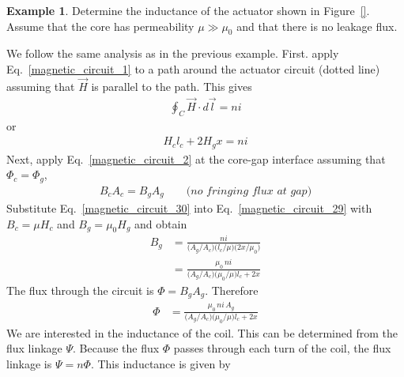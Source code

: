 \documentclass[11pt,a4paper,oneside]{book}
\numberwithin{equation}{section}
\theoremstyle{it}
\theoremstyle{definition}
\newtheorem{example}{Example}[section]
\begin{document}
\begin{example}
	Determine the inductance of the actuator shown in Figure~\ref{}. Assume that the core has permeability $\mu\gg\mu_0$ and that there is no leakage flux.
	
	We follow the same analysis as in the previous example.  First. apply Eq.~\eqref{magnetic_circuit_1} to a path around the actuator circuit (dotted line) assuming that $\vec{H}$ is parallel to the path. This gives
	\begin{equation*}\label{}
	{\begin{aligned}
			\oint_{C}\vec{H}\cdot d\vec{l}=ni
	\end{aligned}}
	\end{equation*}
or
	\begin{equation}\label{magnetic_circuit_29}
		{\begin{aligned}
			H_cl_c+2H_gx=ni
		\end{aligned}}
	\end{equation}
Next, apply Eq.~\eqref{magnetic_circuit_2} at the core-gap interface assuming that $\Phi_c=\Phi_g$,
	\begin{equation}\label{magnetic_circuit_30}
	{\begin{aligned}
			B_cA_c=B_gA_g\qquad\textit{(no fringing flux at gap)}
	\end{aligned}}
	\end{equation}
Substitute Eq.~\eqref{magnetic_circuit_30} into Eq.~\eqref{magnetic_circuit_29} with $B_c=\mu H_c$ and $B_g=\mu_0 H_g$ and obtain
\begin{equation*}\label{}
{\begin{aligned}
		B_g &=\frac{ni}{\Big(A_g/A_c\Big)\Big(l_c/\mu\Big)\Big(2x/\mu_0\Big)} \\[6pt]
		&=\frac{\mu_0\,ni}{\Big(A_g/A_c\Big)\Big(\mu_0/\mu\Big)l_c+2x}
\end{aligned}}
\end{equation*}
The flux through the circuit is $\Phi=B_g A_g$. Therefore
\begin{equation*}\label{}
	{\begin{aligned}
			\Phi &=\frac{\mu_0\,ni\,A_g}{\Big(A_g/A_c\Big)\Big(\mu_0/\mu\Big)l_c+2x}
	\end{aligned}}
\end{equation*}
We are interested in the inductance of the coil. This can be determined from the flux linkage $\Psi$. Because the flux $\Phi$ passes through each turn of the coil, the flux linkage is $\Psi=n\Phi$. This inductance is given by
\begin{equation*}\label{}

\end{equation*}
\end{example}
\end{document}
